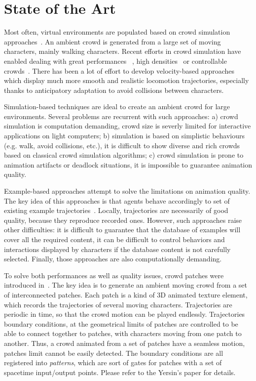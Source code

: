 \section{State of the Art}
\label{sec:star}

Most often, virtual environments are populated based on crowd simulation approaches~\cite{ThalmannBook:2013}. An ambient crowd is generated from a large set of moving characters, mainly walking characters. Recent efforts in crowd simulation have enabled dealing with great performances ~\cite{PettreCAVW:2006,Treuille:2006}, high densities~\cite{Narain:2009} or controllable crowds~\cite{Guy:2009}. There has been a lot of effort to develop velocity-based approaches~\cite{Paris:2007,VanDenBerg:2008} which display much more smooth and realistic locomotion trajectories, especially thanks to anticipatory adaptation to avoid collisions between characters. 

Simulation-based techniques are ideal to create an ambient crowd for large environments. Several problems are recurrent with such approaches: a) crowd simulation is computation demanding, crowd size is severly limited for interactive applications on light computers; b) simulation is based on simplistic behaviours (e.g. walk, avoid collisions, etc.), it is difficult to show diverse and rich crowds based on classical crowd simulation algorithms; c) crowd simulation is prone to animation artifacts or deadlock situations, it is impossible to guarantee animation quality. 

Example-based approaches attempt to solve the limitations on animation quality. The key idea of this approaches is that agents behave accordingly to set of existing example trajectories~\cite{Lerner:2007,Ju:2010,Charalambous:2014}. Locally, trajectories are necessarily of good quality, because they reproduce recorded ones. However, such approaches raise other difficulties: it is difficult to guarantee that the database of examples will cover all the required content, it can be difficult to control behaviors and interactions displayed by characters if the database content is not carefully selected. Finally, those approaches are also computationally demanding.

To solve both performances as well as quality issues, crowd patches were introduced in~\cite{Yersin:2009}. The key idea is to generate an ambient moving crowd from a set of interconnected patches. Each patch is a kind of 3D animated texture element, which records the trajectories of several moving characters. Trajectories are periodic in time, so that the crowd motion can be played endlessly. Trajectories boundary conditions, at the geometrical limits of patches are controlled to be able to connect together to patches, with characters moving from one patch to another. Thus, a crowd animated from a set of patches have a seamless motion, patches limit cannot be easily detected. The boundary conditions are all registered into {\it patterns}, which are sort of gates for patches with a set of spacetime input/output points. Please refer to the Yersin's paper for details. 

